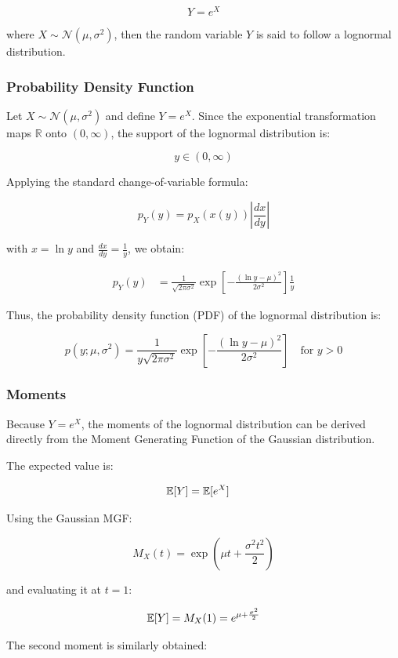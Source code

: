 \[
Y = e^X
\]

where $X \sim \mathcal{N}(\mu,\sigma^2)$, then the random variable $Y$ is said to follow a lognormal distribution. 

\subsubsection{Probability Density Function}
Let $X \sim \mathcal{N}(\mu,\sigma^2)$ and define $Y=e^X$. Since the exponential transformation maps $\mathbb{R}$ onto $(0,\infty)$, the support of the lognormal distribution is:

\[
y \in (0,\infty)
\]

Applying the standard change-of-variable formula:

\[
p_Y(y) = p_X(x(y))\left|\frac{dx}{dy}\right|
\]

with $x = \ln y$ and $\frac{dx}{dy} = \frac{1}{y}$, we obtain:

\begin{align*}
	p_Y(y) &= \frac{1}{\sqrt{2\pi\sigma^2}}
	\exp\left[-\frac{(\ln y-\mu)^2}{2\sigma^2}\right]\frac{1}{y}
\end{align*}

Thus, the probability density function (PDF) of the lognormal distribution is:

\begin{equation}
	p(y;\mu,\sigma^2)=
	\frac{1}{y\sqrt{2\pi\sigma^2}}
	\exp\left[
	-\frac{(\ln y-\mu)^2}{2\sigma^2}
	\right]
	\quad \text{for } y>0
	\label{pdf:lognormal}
\end{equation}

\subsubsection{Moments}
Because $Y=e^X$, the moments of the lognormal distribution can be derived directly from the Moment Generating Function of the Gaussian distribution.

The expected value is:

\begin{align*}
	\mathbb{E}[Y]
	&= \mathbb{E}[e^X]
\end{align*}

Using the Gaussian MGF:

\[
M_X(t)=\exp\left(\mu t+\frac{\sigma^2 t^2}{2}\right)
\]

and evaluating it at $t=1$:

\[
\mathbb{E}[Y]=M_X(1)=e^{\mu+\frac{\sigma^2}{2}}
\]

The second moment is similarly obtained:

